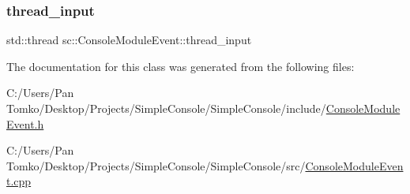 \mbox{\label{classsc_1_1_console_module_event_a5a09e0aedb260fe975aa9854b278d277}} 
\subsubsection{\texorpdfstring{thread\_input}{thread\_input}}
{\footnotesize\ttfamily std\+::thread sc\+::\+Console\+Module\+Event\+::thread\+\_\+input}



The documentation for this class was generated from the following files\+:\begin{DoxyCompactItemize}
\item 
C\+:/\+Users/\+Pan Tomko/\+Desktop/\+Projects/\+Simple\+Console/\+Simple\+Console/include/\mbox{\hyperlink{_console_module_event_8h}{Console\+Module\+Event.\+h}}\item 
C\+:/\+Users/\+Pan Tomko/\+Desktop/\+Projects/\+Simple\+Console/\+Simple\+Console/src/\mbox{\hyperlink{_console_module_event_8cpp}{Console\+Module\+Event.\+cpp}}\end{DoxyCompactItemize}
